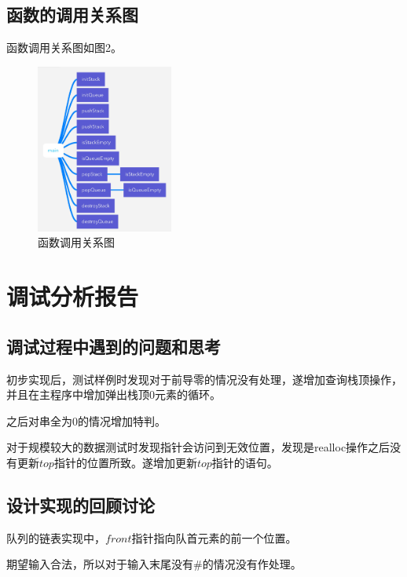 \documentclass{article}
\begin{document}
\subsection{函数的调用关系图}

函数调用关系图如图2。

\begin{figure}[htbp]
    
    \centering\includegraphics[width=0.4\textwidth]{./Images/pic2_2_2.png}
    
    \caption{函数调用关系图}
    
\end{figure}

\section{调试分析报告}

\subsection{调试过程中遇到的问题和思考}

初步实现后，测试样例时发现对于前导零的情况没有处理，遂增加查询栈顶操作，并且在主程序中增加弹出栈顶0元素的循环。

之后对串全为0的情况增加特判。

对于规模较大的数据测试时发现指针会访问到无效位置，发现是realloc操作之后没有更新$top$指针的位置所致。遂增加更新$top$指针的语句。

\subsection{设计实现的回顾讨论}

队列的链表实现中，$front$指针指向队首元素的前一个位置。

期望输入合法，所以对于输入末尾没有\#的情况没有作处理。
\end{document}
